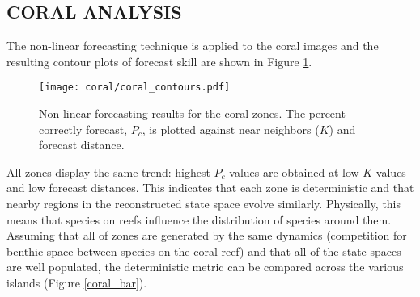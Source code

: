 



\subsection{CORAL ANALYSIS}


The non-linear forecasting technique is applied to the coral images and the resulting contour plots of forecast skill are shown in Figure \ref{coral_contours}.

\begin{figure}[htbp] %
   \centering
   \texttt{[image: coral/coral\_contours.pdf]} 
   \caption{Non-linear forecasting results for the coral zones. The percent correctly forecast, $P_c$, is plotted against near neighbors ($K$) and forecast distance.}
   \label{coral_contours}
\end{figure}

All zones display the same trend: highest $P_c$ values are obtained at low $K$ values and low forecast distances. This indicates that each zone is deterministic and that nearby regions in the reconstructed state space evolve similarly. Physically, this means that species on reefs influence the distribution of species around them. Assuming that all of zones are generated by the same dynamics (competition for benthic space between species on the coral reef) and that all of the state spaces are well populated, the deterministic metric can be compared across the various islands (Figure \ref{coral_bar}).
 
